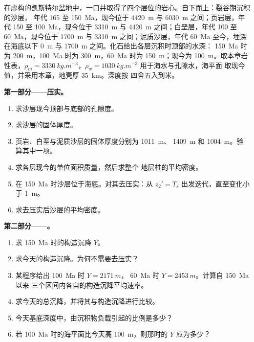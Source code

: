 \begin{problem}\label{pb:b2:basins-compared:1}
在虚构的凯斯特尔盆地中，一口井取得了四个层位的岩心。自下而上：裂谷期沉积的沙层，
年代 165 至 \qty{150}{Ma}，现今位于 \qty{4420}{m} 与 \qty{6030}{m} 之间；页岩层，年代 150
至 \qty{100}{Ma}，现今位于 \qty{3310}{m} 与 \qty{4420}{m} 之间；白垩层，年代 100 至 \qty{60}{Ma}，现今位于
\qty{1700}{m} 与 \qty{3310}{m} 之间；泥质沙层，年代 \qty{60}{Ma} 至今，埋深在海底以下 \qty{0}{m} 与
\qty{1700}{m} 之间。化石给出各层沉积时顶部的水深：
\qty{150}{Ma} 时为 \qty{200}{m}，\qty{100}{Ma} 时为 \qty{300}{m}，\qty{60}{Ma} 时为
\qty{150}{m}；现今为 \qty{100}{m}。取本章岩性表，$\rho_m =
\qty{3330}{kg.m^{-3}}$，$\rho_w = \qty{1030}{kg.m^{-3}}$ 用于海水与孔隙水，海平面
取现今值，并采用本章，地壳厚 \qty{35}{km}。深度按
四舍五入到米。

\noindent\textbf{第一部分——压实。}
\begin{enumerate}
  \item 求沙层现今顶部与底部的孔隙度。
  \item 求沙层的固体厚度。
  \item 页岩、白垩与泥质沙层的固体厚度分别为 \qty{1011}{m}、
        \qty{1409}{m} 和 \qty{1004}{m}。验算其中一项。
  \item 求各层现今的单位面积质量，然后求整个
        地层柱的平均密度。
  \item 在 \qty{150}{Ma} 时沙层位于海底。对其去压实：从 $z_2' =
        T_s$ 出发迭代，直至变化小于 \qty{1}{m}。
  \item 求去压实后沙层的平均密度。
\end{enumerate}

\noindent\textbf{第二部分——。}
\begin{enumerate}[resume]
  \item 求 \qty{150}{Ma} 时的构造沉降 $Y$。
  \item 求今天的构造沉降。为何不需要去压实？
  \item 某程序给出 \qty{100}{Ma} 时 $Y = \qty{2171}{m}$，
        \qty{60}{Ma} 时 $Y = \qty{2453}{m}$。计算自 \qty{150}{Ma} 以来
        三个区间内各自的构造沉降平均速率。
  \item 求今天的总沉降，并将其与构造沉降进行比较。
  \item 今天基底深度中，由沉积物负载引起的比例是多少？
  \item 若 \qty{100}{Ma} 时的海平面比今天高 \qty{100}{m}，则那时的 $Y$
        应为多少？
\end{enumerate}


\end{problem}

